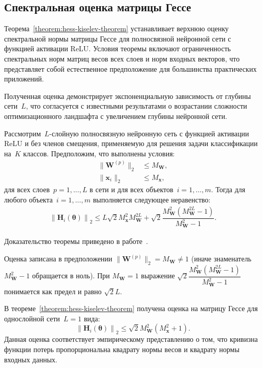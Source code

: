 \subsection{Спектральная оценка матрицы Гессе}

Теорема~\ref{theorem:hess-kiselev-theorem} устанавливает верхнюю оценку спектральной нормы матрицы Гессе для полносвязной нейронной сети с функцией активации ReLU. Условия теоремы включают ограниченность спектральных норм матриц весов всех слоев и норм входных векторов, что представляет собой естественное предположение для большинства практических приложений.

Полученная оценка демонстрирует экспоненциальную зависимость от глубины сети~$L$, что согласуется с известными результатами о возрастании сложности оптимизационного ландшафта с увеличением глубины нейронной сети.
\begin{theorem}\label{theorem:hess-kiselev-theorem}
    Рассмотрим~$L$-слойную полносвязную нейронную сеть с функцией активации ReLU и без членов смещения, применяемую для решения задачи классификации на~$K$ классов.
    Предположим, что выполнены условия:
    \begin{align}
        \| \mathbf{W}^{(p)} \|_2 &\leqslant M_{\mathbf{W}},\\
        \| \mathbf{x}_i \|_2 &\leqslant M_{\mathbf{x}},
    \end{align}
    для всех слоев~$p = 1, \ldots, L$ в сети и для всех объектов~$i = 1, \ldots, m.$
    Тогда для любого объекта~$i = 1, \ldots, m$ выполняется следующее неравенство:
    \begin{align}
        \left\| \mathbf{H}_i(\boldsymbol{\theta}) \right\|_2 \leqslant L \sqrt{2} M_{\mathbf{x}}^2 M_{\mathbf{W}}^{2L} + \sqrt{2} \dfrac{M_{\mathbf{W}}^2 (M_{\mathbf{W}}^{2L} - 1)}{M_{\mathbf{W}}^2 - 1}.
    \end{align}
\end{theorem}
Доказательство теоремы приведено в работе~\cite{grabovoi2024unraveling748584228}.

\begin{remark}
Оценка записана в предположении $\| \mathbf{W}^{(p)} \|_2 = M_{\mathbf{W}}\neq 1$ (иначе знаменатель $M_{\mathbf{W}}^2-1$ обращается в ноль). При $M_{\mathbf{W}}=1$ выражение $\sqrt{2}\dfrac{M_{\mathbf{W}}^2 (M_{\mathbf{W}}^{2L} - 1)}{M_{\mathbf{W}}^2 - 1}$ понимается как предел и равно $\sqrt{2}L$.
\end{remark}

\begin{remark}
В теореме~\ref{theorem:hess-kiselev-theorem} получена оценка на матрицу Гессе для однослойной сети~$L=1$ вида:
\[
    \left\| \mathbf{H}_i(\boldsymbol{\theta}) \right\|_2 \leqslant \sqrt{2} M_{\mathbf{W}}^{2} \left( M_{\mathbf{x}}^2 + 1 \right).
\]
Данная оценка соответствует эмпирическому представлению о том, что кривизна функции потерь пропорциональна квадрату нормы весов и квадрату нормы входных данных.
\end{remark}

